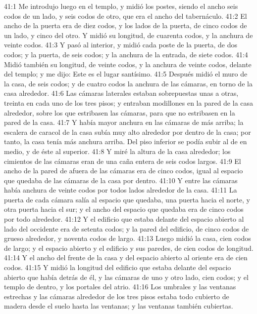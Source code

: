 41:1 Me introdujo luego en el templo, y midió los postes, siendo el ancho seis codos   de un lado, y seis codos de otro, que era el ancho del tabernáculo.   
41:2 El ancho de la puerta era de diez codos, y los lados de la puerta, de cinco codos de un lado, y cinco del otro. Y midió su longitud, de cuarenta codos, y la anchura de veinte codos.   
41:3 Y pasó al interior, y midió cada poste de la puerta, de dos codos; y la puerta, de seis codos; y la anchura de la entrada, de siete codos.   
41:4 Midió también su longitud, de veinte codos, y la anchura de veinte codos, delante del templo; y me dijo: Este es el lugar santísimo.   
41:5 Después midió el muro de la casa, de seis codos; y de cuatro codos la anchura de las cámaras, en torno de la casa alrededor.   
41:6 Las cámaras laterales estaban sobrepuestas unas a otras, treinta en cada uno de los tres pisos; y entraban modillones en la pared de la casa alrededor, sobre los que estribasen las cámaras, para que no estribasen en la pared de la casa.   
41:7 Y había mayor anchura en las cámaras de más arriba; la escalera de caracol de la casa subía muy alto alrededor por dentro de la casa; por tanto, la casa tenía más anchura arriba. Del piso inferior se podía subir al de en medio, y de éste al superior.   
41:8 Y miré la altura de la casa alrededor; los cimientos de las cámaras eran de una caña   entera de seis codos largos.   
41:9 El ancho de la pared de afuera de las cámaras era de cinco codos, igual al espacio que quedaba de las cámaras de la casa por dentro.   
41:10 Y entre las cámaras había anchura de veinte codos   por todos lados alrededor de la casa.   
41:11 La puerta de cada cámara salía al espacio que quedaba, una puerta hacia el norte, y otra puerta hacia el sur; y el ancho del espacio que quedaba era de cinco codos   por todo alrededor.   
41:12 Y el edificio que estaba delante del espacio abierto al lado del occidente era de setenta codos; y la pared del edificio, de cinco codos de grueso alrededor, y noventa codos de largo.   
41:13 Luego midió la casa, cien codos   de largo; y el espacio abierto y el edificio y sus paredes, de cien codos de longitud.   
41:14 Y el ancho del frente de la casa y del espacio abierto al oriente era de cien codos. 
41:15 Y midió la longitud del edificio que estaba delante del espacio abierto que había detrás de él, y las cámaras de uno y otro lado, cien codos; y el templo de dentro, y los portales del atrio.   
41:16 Los umbrales y las ventanas estrechas y las cámaras alrededor de los tres pisos estaba todo cubierto de madera desde el suelo hasta las ventanas; y las ventanas también cubiertas.   
